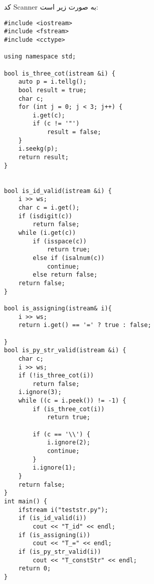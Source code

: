 کد Scanner به صورت زیر است:

\begin{latin}
    \begin{lstlisting}
#include <iostream>
#include <fstream>
#include <cctype>

using namespace std;

bool is_three_cot(istream &i) {
    auto p = i.tellg();
    bool result = true;
    char c;
    for (int j = 0; j < 3; j++) {
        i.get(c);
        if (c != '"')
            result = false;
    }
    i.seekg(p);
    return result;
}


bool is_id_valid(istream &i) {
    i >> ws;
    char c = i.get();
    if (isdigit(c))
        return false;
    while (i.get(c))
        if (isspace(c))
            return true;
        else if (isalnum(c))
            continue;
        else return false;
    return false;
}

bool is_assigning(istream& i){
    i >> ws;
    return i.get() == '=' ? true : false;

}
bool is_py_str_valid(istream &i) {
    char c;
    i >> ws;
    if (!is_three_cot(i))
        return false;
    i.ignore(3);
    while ((c = i.peek()) != -1) {
        if (is_three_cot(i))
            return true;

        if (c == '\\') {
            i.ignore(2);
            continue;
        }
        i.ignore(1);
    }
    return false;
}
int main() {
    ifstream i("teststr.py");
    if (is_id_valid(i))
        cout << "T_id" << endl;
    if (is_assigning(i))
        cout << "T_=" << endl;
    if (is_py_str_valid(i))
        cout << "T_constStr" << endl;
    return 0;
}
    \end{lstlisting}
\end{latin}
